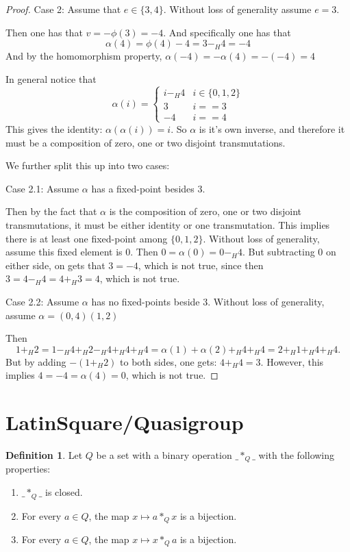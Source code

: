 \documentclass[a4paper, 12pt, english]{article}
\theoremstyle{plain}
\theoremstyle{definition}
\newtheorem{definition}[theorem]{Definition}
\begin{document}
\begin{proof}
    Case 2: Assume that \( e \in \{ 3, 4 \} \). Without loss of generality assume \( e = 3 \).

    Then one has that \( v = -\phi(3) = -4 \). And specifically one has that
    \[
        \alpha(4) = \phi(4) - 4 = 3 -_H 4 = - 4
    \]
    And by the homomorphism property, \( \alpha(-4) = -\alpha(4) = -(-4) = 4 \)

    In general notice that
    \[
        \alpha(i) =
        \begin{cases}
            i -_H 4 & i \in \{ 0, 1, 2 \} \\
            3 & i == 3 \\
            -4 & i == 4
        \end{cases}
    \]
    This gives the identity: \( \alpha(\alpha(i)) = i \). So \( \alpha \) is it's own inverse, and therefore it must be a composition of zero, one or two disjoint transmutations.

    We further split this up into two cases:

    Case 2.1: Assume \( \alpha \) has a fixed-point besides \( 3 \).

    Then by the fact that \( \alpha \) is the composition of zero, one or two disjoint transmutations, it must be either identity or one transmutation. This implies there is at least one fixed-point among \( \{ 0, 1, 2 \} \). Without loss of generality, assume this fixed element is \( 0 \). Then \( 0 = \alpha(0) = 0 -_H 4 \). But subtracting \( 0 \) on either side, on gets that \( 3 = -4 \), which is not true, since then \( 3 = 4 -_H 4 = 4 +_H 3 = 4 \), which is not true.

    Case 2.2: Assume \( \alpha \) has no fixed-points beside \( 3 \). Without loss of generality, assume \( \alpha = (0, 4)(1, 2) \)

    Then 
    \[ 
        1 +_H 2 = 1 -_H 4 +_H 2 -_H 4 +_H 4 +_H 4 = \alpha(1) + \alpha(2) +_H 4 +_H 4 = 2 +_H 1 +_H 4 +_H 4.
    \]
    But by adding \( -(1 +_H 2) \) to both sides, one gets: \( 4 +_H 4 = 3\). However, this implies \( 4 = -4 = \alpha(4) = 0 \), which is not true.
\end{proof}

\section{LatinSquare/Quasigroup}

\begin{definition}
    Let \( Q \) be a set with a binary operation \( \_ *_Q \_ \) with the following properties:
    \begin{enumerate}
        \item \( \_ *_Q \_ \) is closed.
        \item For every \( a \in Q \), the map \( x \mapsto a *_Q x \) is a bijection.
        \item For every \( a \in Q \), the map \( x \mapsto x *_Q a \) is a bijection.
    \end{enumerate}
\end{definition}
\end{document}
